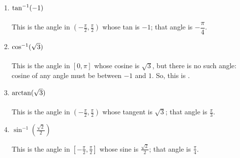 \documentclass{article}
\begin{document}
\begin{warmup}
\begin{enumerate}[topsep=0pt,label=W\arabic*., ref=\#W\arabic*]
{\begin{enumerate}
      \item
\begin{problem}
          $\tan^{-1} (-1) \vphantom{\left( \frac{1}{\sqrt{1}}
            \right)}$
        \end{problem}

        \begin{solution}
          This is the angle in $\left( - \frac{\pi}{2}, \frac{\pi}{2}
          \right)$ whose tan is $-1$; that angle is 
          $\boxed{-\dfrac{\pi}{4}}$. 
        \end{solution}

      \item
        \begin{problem}
          $\cos^{-1} (\sqrt{3}) \vphantom{\left(
              \frac{1}{\sqrt{1}} \right)}$
        \end{problem}
        \pspace{0.4in}

        \begin{solution}
          This is the angle in $[0, \pi]$ whose cosine is $\sqrt{3}$, but
          there is no such angle: cosine of any angle must be between $-1$
          and $1$.  So, this is .
        \end{solution}
        

      \item
        \begin{problem}
          $\arctan (\sqrt{3}) \vphantom{\left(
              \frac{1}{\sqrt{1}} \right)}$
        \end{problem}
        \pspace{0.4in}

        \begin{solution}
          This is the angle in $\left( - \frac{\pi}{2}, \frac{\pi}{2}
          \right)$ whose tangent is $\sqrt{3}$; that angle is
          $\boxed{\frac{\pi}{3}}$. 
        \end{solution}

      \item
        \begin{problem}
          $\sin^{-1}(\frac{\sqrt2}{2})$
        \end{problem}

        \begin{solution}
          This is the angle in $\left[ - \frac{\pi}{2}, \frac{\pi}{2}
          \right]$ whose sine is $\frac{\sqrt{2}}{2}$; that angle is
          $\boxed{\frac{\pi}{4}}$. 
        \end{solution}


\end{enumerate}}
\end{enumerate}
\end{warmup}
\end{document}
